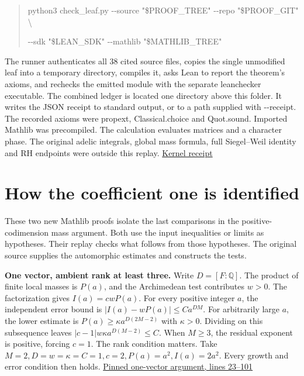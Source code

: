 \documentclass[11pt,letterpaper]{article}
\begin{document}
\begin{quote}\raggedright\setlength{\parskip}{1pt}
{\ttfamily\small python3 check\_\allowbreak{}leaf.\allowbreak{}py -\allowbreak{}-\allowbreak{}source "\$PROOF\_\allowbreak{}TREE" -\allowbreak{}-\allowbreak{}repo "\$PROOF\_\allowbreak{}GIT" \textbackslash{}}\par
{\ttfamily\small   -\allowbreak{}-\allowbreak{}sdk "\$LEAN\_\allowbreak{}SDK" -\allowbreak{}-\allowbreak{}mathlib "\$MATHLIB\_\allowbreak{}TREE"}\par
\end{quote}
The runner authenticates all 38 cited source files, copies the single unmodified leaf into a temporary directory, compiles it, asks Lean to report the theorem’s axioms, and rechecks the emitted module with the separate {\ttfamily\small leanchecker} executable. The combined ledger is located one directory above this folder. It writes the JSON receipt to standard output, or to a path supplied with {\ttfamily\small -\allowbreak{}-\allowbreak{}receipt}. The recorded axioms were {\ttfamily\small propext}, {\ttfamily\small Classical.\allowbreak{}choice} and {\ttfamily\small Quot.\allowbreak{}sound}. Imported Mathlib was precompiled. The calculation evaluates matrices and a character phase. The original adelic integrals, global mass formula, full Siegel–Weil identity and RH endpoints were outside this replay. \href{https://github.com/nousentllc/riemann-hypothesis/blob/2c03d15e908bcbe4aae3c94a87c7ada402cd7911/research/uriel/experiments/siegel-weil-constant-term/orbit-cell/leaf_receipt.json}{Kernel receipt}

\clearpage\section{How the coefficient one is identified}
These two new Mathlib proofs isolate the last comparisons in the positive-codimension mass argument. Both use the input inequalities or limits as hypotheses. Their replay checks what follows from those hypotheses. The original source supplies the automorphic estimates and constructs the tests.

\textbf{One vector, ambient rank at least three.} Write \(D=[F:\mathbb Q]\). The product of finite local masses is \(P(a)\), and the Archimedean test contributes \(w>0\). The factorization gives \(I(a)=cwP(a)\). For every positive integer \(a\), the independent error bound is \(|I(a)-wP(a)|\le C a^{DM}\). For arbitrarily large \(a\), the lower estimate is \(P(a)\ge\kappa a^{D(2M-2)}\) with \(\kappa>0\). Dividing on this subsequence leaves \(|c-1|w\kappa a^{D(M-2)}\le C\). When \(M\ge3\), the residual exponent is positive, forcing \(c=1\). The rank condition matters. Take \(M=2,D=w=\kappa=C=1,c=2,P(a)=a^2,I(a)=2a^2\). Every growth and error condition then holds. \href{https://github.com/nousentllc/riemann-hypothesis/blob/40e56bab026552e089d7afcfeff08d2defb9c005/src/CompanionTheory/AutomorphicTheory/ThetaDilations/SwOne.lean\#L23-L101}{Pinned one-vector argument, lines 23–101}
\end{document}

